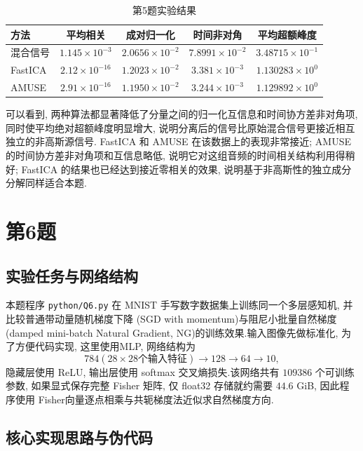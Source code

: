 ﻿\documentclass[UTF8,  zihao=-4]{ctexart}
\begin{document}
\begin{table}[htbp]
\centering
\caption{第5题实验结果}
\label{tab:q5_metrics}
\begin{tabular}{lcccc}
\toprule
方法
& 平均相关
& 成对归一化
& 时间非对角
& 平均超额峰度
\\
\midrule
混合信号
& \(1.145\times10^{-3}\)
& \(2.0656\times10^{-2}\)
& \(7.8991\times10^{-2}\)
& \(3.48715\times10^{-1}\)
\\
FastICA
& \(2.12\times 10^{-16}\)
& \(1.2023\times10^{-2}\)
& \(3.381\times10^{-3}\)
& \(1.130283\times10^{0}\)
\\
AMUSE
& \(2.91\times 10^{-16}\)
& \(1.1950\times10^{-2}\)
& \(3.244\times10^{-3}\)
& \(1.129892\times10^{0}\)
\\
\bottomrule
\end{tabular}
\end{table}

可以看到,  两种算法都显著降低了分量之间的归一化互信息和时间协方差非对角项,  同时使平均绝对超额峰度明显增大,  说明分离后的信号比原始混合信号更接近相互独立的非高斯源信号. FastICA 和 AMUSE 在该数据上的表现非常接近; AMUSE 的时间协方差非对角项和互信息略低,  说明它对这组音频的时间相关结构利用得稍好; FastICA 的结果也已经达到接近零相关的效果,  说明基于非高斯性的独立成分分解同样适合本题.

\section{第6题}

\subsection{实验任务与网络结构}

本题程序 \texttt{python/Q6.py} 在 MNIST 手写数字数据集上训练同一个多层感知机,  并比较普通带动量随机梯度下降
(SGD with momentum)与阻尼小批量自然梯度(damped mini-batch Natural Gradient,   NG)的训练效果.输入图像先做标准化,  
为了方便代码实现,  这里使用MLP,  网络结构为
\[
    784(28\times28\text{个输入特征}) \longrightarrow 128 \longrightarrow 64 \longrightarrow 10,  
\]
隐藏层使用 ReLU,  输出层使用 softmax 交叉熵损失.该网络共有 \(109386\) 个可训练参数,  如果显式保存完整 Fisher 矩阵,  
仅 float32 存储就约需要 \(44.6\) GiB,  因此程序使用 Fisher向量逐点相乘与共轭梯度法近似求自然梯度方向.

\subsection{核心实现思路与伪代码}
\end{document}
